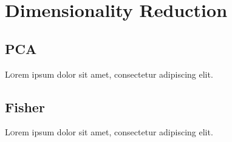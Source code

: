 \section{Dimensionality Reduction}

\subsection{PCA}
\lettrine[nindent=0em,lines=3]{L} orem ipsum dolor sit amet, consectetur adipiscing elit.
\lipsum[2] %


\subsection{Fisher}
\lettrine[nindent=0em,lines=3]{L} orem ipsum dolor sit amet, consectetur adipiscing elit.
\lipsum[2] %


